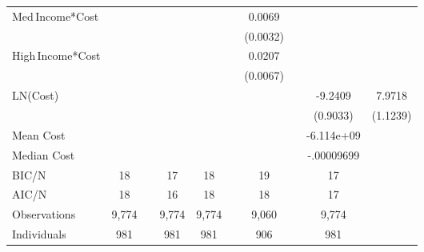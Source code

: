 {\begin{tabular}{l*{9}{c}}
Med\,Income*Cost &                  &                  &                  &                  &                  &   0.0069\sym{**} &                  &                  &                  \\
                &                  &                  &                  &                  &                  & (0.0032)         &                  &                  &                  \\
High\,Income*Cost&                  &                  &                  &                  &                  &   0.0207\sym{***}&                  &                  &                  \\
                &                  &                  &                  &                  &                  & (0.0067)         &                  &                  &                  \\
LN(Cost)        &                  &                  &                  &                  &                  &                  &                  &  -9.2409\sym{***}&   7.9718\sym{***}\\
                &                  &                  &                  &                  &                  &                  &                  & (0.9033)         & (1.1239)         \\
\hline
Mean Cost       &                  &                  &                  &                  &                  &                  &                  &-6.114e+09         &                  \\
Median Cost     &                  &                  &                  &                  &                  &                  &                  &-.00009699         &                  \\
BIC/N           &       18         &                  &       17         &       18         &                  &       19         &                  &       17         &                  \\
AIC/N           &       18         &                  &       16         &       18         &                  &       18         &                  &       17         &                  \\
Observations    &    9,774         &                  &    9,774         &    9,774         &                  &    9,060         &                  &    9,774         &                  \\
Individuals     &      981         &                  &      981         &      981         &                  &      906         &                  &      981         &                  \\
\hline\hline
\end{tabular}
}
